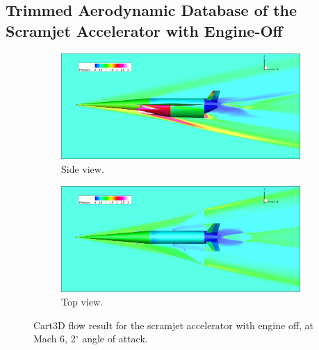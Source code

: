 \subsection{Trimmed Aerodynamic Database of the Scramjet Accelerator with Engine-Off}\label{sec:trimmedongineoff}
\begin{figure}[!ht]
\begin{subfigure}{.9\textwidth}
	\centering
	\includegraphics[width=0.9\linewidth]{figures/3_vehicle_design/CartSide}
	\caption{Side view.}
	\label{fig:CartSide}
\end{subfigure}
\begin{subfigure}{.9\textwidth}
	\centering
	\includegraphics[width=0.9\linewidth]{figures/3_vehicle_design/CartTop}
	\caption{Top view.}
	\label{fig:CartTop}
\end{subfigure}
\caption{Cart3D flow result for the scramjet accelerator with engine off, at Mach 6, 2$^\circ$ angle of attack.}
\label{fig:CartSPART}
\end{figure}
